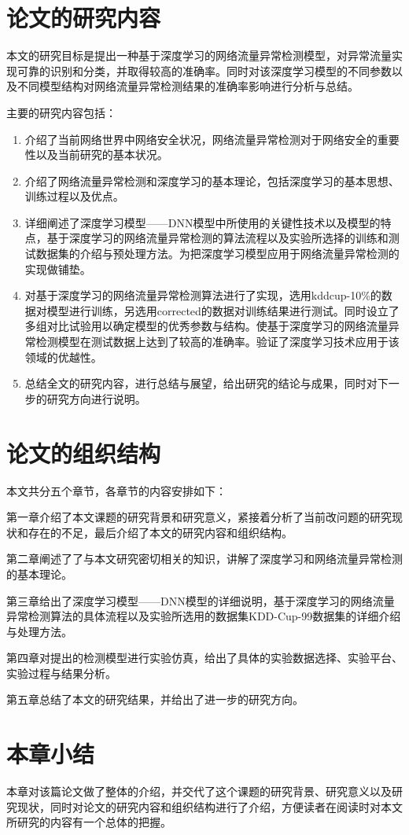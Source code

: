 \section{论文的研究内容}

本文的研究目标是提出一种基于深度学习的网络流量异常检测模型，对异常流量实现可靠的识别和分类，并取得较高的准确率。同时对该深度学习模型的不同参数以及不同模型结构对网络流量异常检测结果的准确率影响进行分析与总结。

主要的研究内容包括：
\begin{enumerate}
    \item 介绍了当前网络世界中网络安全状况，网络流量异常检测对于网络安全的重要性以及当前研究的基本状况。
    \item 介绍了网络流量异常检测和深度学习的基本理论，包括深度学习的基本思想、训练过程以及优点。
    \item 详细阐述了深度学习模型——DNN模型中所使用的关键性技术以及模型的特点，基于深度学习的网络流量异常检测的算法流程以及实验所选择的训练和测试数据集的介绍与预处理方法。为把深度学习模型应用于网络流量异常检测的实现做铺垫。
    \item 对基于深度学习的网络流量异常检测算法进行了实现，选用kddcup-10\%的数据对模型进行训练，另选用corrected的数据对训练结果进行测试。同时设立了多组对比试验用以确定模型的优秀参数与结构。使基于深度学习的网络流量异常检测模型在测试数据上达到了较高的准确率。验证了深度学习技术应用于该领域的优越性。
    \item 总结全文的研究内容，进行总结与展望，给出研究的结论与成果，同时对下一步的研究方向进行说明。
\end{enumerate}

\section{论文的组织结构}

本文共分五个章节，各章节的内容安排如下：

第一章介绍了本文课题的研究背景和研究意义，紧接着分析了当前改问题的研究现状和存在的不足，最后介绍了本文的研究内容和组织结构。

第二章阐述了了与本文研究密切相关的知识，讲解了深度学习和网络流量异常检测的基本理论。

第三章给出了深度学习模型——DNN模型的详细说明，基于深度学习的网络流量异常检测算法的具体流程以及实验所选用的数据集KDD-Cup-99数据集的详细介绍与处理方法。

第四章对提出的检测模型进行实验仿真，给出了具体的实验数据选择、实验平台、实验过程与结果分析。

第五章总结了本文的研究结果，并给出了进一步的研究方向。

\section{本章小结}

本章对该篇论文做了整体的介绍，并交代了这个课题的研究背景、研究意义以及研究现状，同时对论文的研究内容和组织结构进行了介绍，方便读者在阅读时对本文所研究的内容有一个总体的把握。